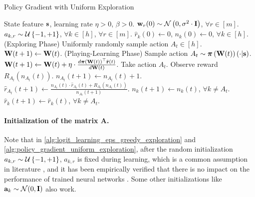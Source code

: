 \begin{algorithm}[t]
   \caption{Policy Gradient with Uniform Exploration}
\label{alg:policy_gradient_uniform_exploration}
\begin{algorithmic}
    State feature ${\mathbf{s}}$, learning rate $\eta > 0$, $\beta > 0$.
   \STATE ${\mathbf{w}}_r(0) \sim {\mathcal{N}}\left( 0, \sigma^2 \cdot {\mathbf{I}} \right)$, $\forall r \in [m]$.
   \STATE $a_{k, r} \sim {\mathcal{U}}\left\{-1, +1\right\}$, $\forall k \in [h]$, $\forall r \in [m]$.
   \STATE $\hat{r}_{k}\left(0\right) \gets 0$, $n_{k}\left(0\right) \gets 0$, $\forall k \in [h]$.
   \STATE (Exploring Phase)
   \STATE Uniformly randomly sample action $A_{t} \in [h]$.
   \STATE ${\mathbf{W}}(t+1) \leftarrow {\mathbf{W}}(t)$.
   \ELSE
   \STATE (Playing-Learning Phase)
   \STATE Sample action $A_{t} \sim {\boldsymbol{\pi}}\left({\mathbf{W}}(t)\right)\left(\cdot \middle| {\mathbf{s}} \right)$.
   \STATE ${\mathbf{W}}(t+1) \leftarrow {\mathbf{W}}(t) + \eta \cdot \frac{d {\boldsymbol{\pi}}\left({\mathbf{W}}(t)\right)^\top \hat{{\mathbf{r}}} \left(t\right)}{d {\mathbf{W}}(t)}$.
   \ENDIF
   \STATE Take action $A_{t}$. Observe reward $R_{ A_{t}}\left(n_{ A_{t}}\left(t\right) \right)$.
   \STATE $n_{ A_{t}}\left(t+1\right) \gets n_{ A_{t}}\left(t\right) + 1$.
   \STATE $\hat{r}_{A_{t}}\left(t+1\right) \gets \frac{n_{ A_{t}}\left(t\right) \cdot \hat{r}_{A_{t}}\left(t\right) + R_{ A_{t}}\left(n_{A_{t}}\left(t\right)\right) }{n_{ A_{t}}\left(t+1\right)}$.
   \STATE $n_{ k}\left(t+1\right) \gets n_{ k}\left(t\right)$, $\forall k \not= A_t$.
   \STATE $\hat{r}_{k}\left(t+1\right) \gets \hat{r}_{k}\left(t\right)$, $\forall k \not= A_t$.
   \ENDFOR
\end{algorithmic}
\end{algorithm}

\paragraph{Initialization of the matrix $\mathbf{A}$.} Note that in \cref{alg:logit_learning_eps_greedy_exploration} and \cref{alg:policy_gradient_uniform_exploration}, after the random initialization $a_{k,r} \sim {\mathcal{U}}\left\{-1, +1\right\}$, $a_{k,r}$ is fixed during learning, which is a common assumption in literature \citep{li2018learning,du2018gradientA,du2018gradientB,allen2018convergenceA,allen2018convergenceB}, and it has been empirically verified that there is no impact on the performance of trained neural networks \citep{hoffer2018fix}. Some other initializations like ${\mathbf{a}}_k \sim {\mathcal{N}}(0, {\mathbf{I}})$ also work.


